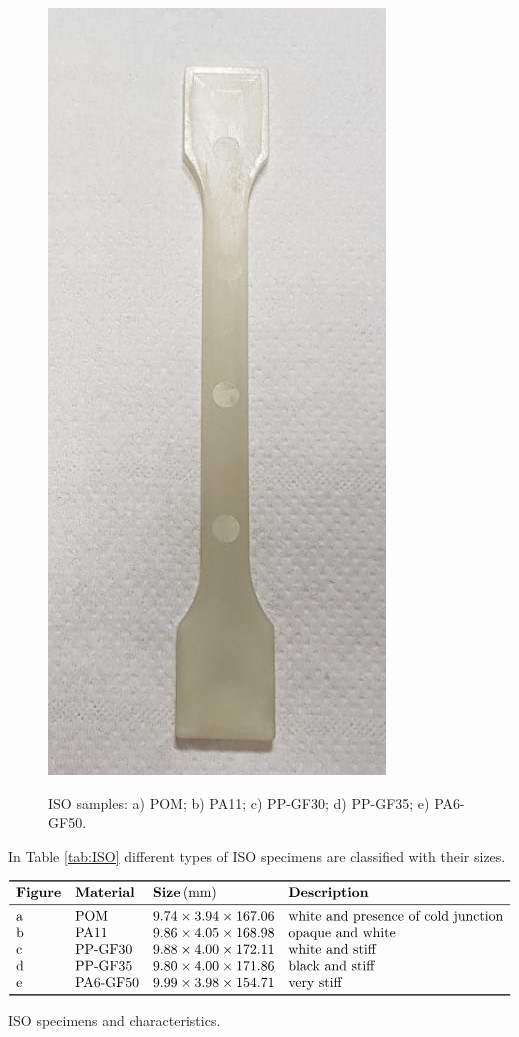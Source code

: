 \documentclass[a4paper, 11pt]{article}
\begin{document}
\begin{figure}[htp]
{\includegraphics[scale=0.25]{PA6GF}}
\captionsetup{justification=centering}
\caption{ISO samples: a) POM; b) PA11; c) PP-GF30; d) PP-GF35; e) PA6-GF50. }
\label{fig:ISO}
\end{figure}

In Table \ref{tab:ISO} different types of ISO specimens are classified with their sizes.

\begin{table}[htp]
\centering
$
\begin{array}{llll}
\toprule
\textbf{Figure} & \textbf{Material} & \textbf{Size}\,(\text{mm}) & \textbf{Description} \\
\midrule
\text{a} & \text{POM} & 9.74\times 3.94\times 167.06 & \text{white and presence of cold junction}\\
\text{b} & \text{PA11} & 9.86\times 4.05\times 168.98 & \text{opaque and white}\\
\text{c} & \text{PP-GF30} & 9.88\times 4.00\times 172.11 & \text{white and stiff}\\
\text{d} & \text{PP-GF35} & 9.80\times 4.00\times 171.86 & \text{black and stiff}\\
\text{e} & \text{PA6-GF50} & 9.99\times 3.98\times 154.71 & \text{very stiff}\\
\bottomrule
\end{array}
$
\caption{ISO specimens and characteristics.}
\label{tab:ISO}
\end{table}
\end{document}
